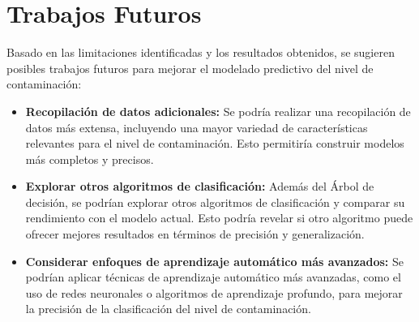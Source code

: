 \section{Trabajos Futuros}

Basado en las limitaciones identificadas y los resultados obtenidos, se sugieren posibles trabajos futuros para mejorar el modelado predictivo del nivel de contaminación:

\begin{itemize}
    \item \textbf{Recopilación de datos adicionales:} Se podría realizar una recopilación de datos más extensa, incluyendo una mayor variedad de características relevantes para el nivel de contaminación. Esto permitiría construir modelos más completos y precisos.
    \item \textbf{Explorar otros algoritmos de clasificación:} Además del Árbol de decisión, se podrían explorar otros algoritmos de clasificación y comparar su rendimiento con el modelo actual. Esto podría revelar si otro algoritmo puede ofrecer mejores resultados en términos de precisión y generalización.
    \item \textbf{Considerar enfoques de aprendizaje automático más avanzados:} Se podrían aplicar técnicas de aprendizaje automático más avanzadas, como el uso de redes neuronales o algoritmos de aprendizaje profundo, para mejorar la precisión de la clasificación del nivel de contaminación.
\end{itemize}
